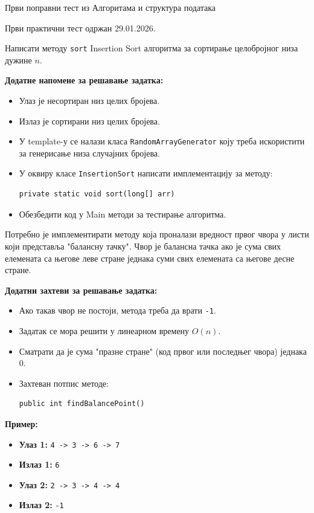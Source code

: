 
Први поправни тест из Алгоритама и структура података

Први практични тест одржан 29.01.2026.

Написати методу \texttt{sort} Insertion Sort алгоритма за сортирање целобројног низа дужине $n$.

\textbf{Додатне напомене за решавање задатка:}
\begin{itemize}
	\item Улаз је несортиран низ целих бројева.
	\item Излаз је сортирани низ целих бројева.
	\item У template-у се налази класа \texttt{RandomArrayGenerator} коју треба искористити за генерисање низа случајних бројева.
	\item У оквиру класе \texttt{InsertionSort} написати имплементацију за методу:
	\begin{Verbatim}[fontsize=\small]
private static void sort(long[] arr)
	\end{Verbatim}
	\item Обезбедити код у Main методи за тестирање алгоритма.
\end{itemize}

Потребно је имплементирати методу која проналази вредност првог чвора у листи који представља "балансну тачку". Чвор је балансна тачка ако је сума свих елемената са његове леве стране једнака суми свих елемената са његове десне стране.

\textbf{Додатни захтеви за решавање задатка:}
\begin{itemize}
	\item Ако такав чвор не постоји, метода треба да врати \texttt{-1}.
	\item Задатак се мора решити у линеарном времену $O(n)$.
	\item Сматрати да је сума "празне стране" (код првог или последњег чвора) једнака 0.
	\item Захтеван потпис методе:
	\begin{Verbatim}[fontsize=\small]
public int findBalancePoint()
	\end{Verbatim}
\end{itemize}

\textbf{Пример:}
\begin{itemize}
	\item \textbf{Улаз 1:} \texttt{4 -> 3 -> 6 -> 7}
	\item \textbf{Излаз 1:} \texttt{6}
	\item \textbf{Улаз 2:} \texttt{2 -> 3 -> 4 -> 4}
	\item \textbf{Излаз 2:} \texttt{-1}
\end{itemize}

